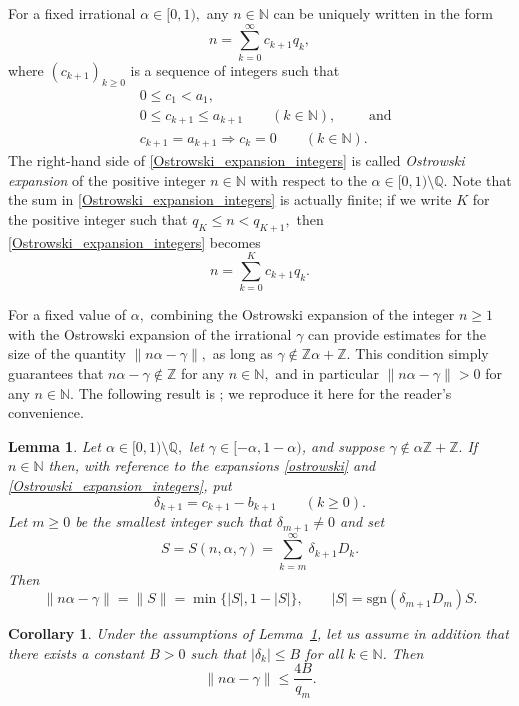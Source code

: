 \documentclass[12pt, reqno]{amsart}
\newtheorem{lemma}[thm]{Lemma}
\newtheorem{cor}[thm]{Corollary}
\theoremstyle{definition}
\theoremstyle{remark}
\numberwithin{equation}{section}
\def\alp{{\alpha}} \def\bfalp{{\boldsymbol \alpha}}
\def\gam{{\gamma}} \def\Gam{{\Gamma}}
\def\del{{\delta}} \def\Del{{\Delta}}
\def\le{\leqslant} \def\ge{\geqslant}
\def\ls{\leqslant} \def\gs{\geqslant}
\def\leq{\leqslant}
\def \bN {\mathbb N}
\def \bQ {\mathbb Q}
\def \bZ {\mathbb Z}
\begin{document}
	For a fixed irrational $\alp\in [0,1),$ any $n\in \bN$ can be uniquely written in the form  
	\begin{equation} \label{Ostrowski_expansion_integers}
		n= \sum_{k=0}^\infty c_{k+1} q_k, 
	\end{equation}
	where $(c_{k+1})_{k\gs 0}$ is a sequence of integers such that 
	\begin{align*}
		& 0 \le c_1 < a_1,  \\
		& 0 \le c_{k+1} \le a_{k+1}
		\qquad (k \in \bN), \qquad \text{ and} \\
		&  c_{k+1} = a_{k+1} \Longrightarrow c_k = 0 \qquad (k \in \bN).
	\end{align*}
	The right-hand side of \eqref{Ostrowski_expansion_integers} is called \emph{Ostrowski expansion} of the positive integer  $n \in \bN$ with respect to the $\alp\in [0,1) \setminus \bQ.$ Note that the sum in \eqref{Ostrowski_expansion_integers} is actually finite; if we write $K$ for the positive integer such that $q_K \ls n < q_{K+1},$ then \eqref{Ostrowski_expansion_integers} becomes
	\[
	n = \sum_{k=0}^K c_{k+1}q_k.
	\]
	
	For a fixed value of $\alp,$ combining the Ostrowski expansion of the integer $n\gs 1$ with the Ostrowski expansion of the irrational $\gamma$ can provide estimates for the size of the quantity $\|n\alpha -\gam\|,$ as long as $\gamma\notin \bZ\alp + \bZ.$ This condition simply guarantees that $n\alpha -\gamma\notin\bZ$ for any $n\in\bN,$ and in particular $\|n\alp-\gam\|>0$ for any $n\in\bN.$ The following result is \cite[Lemma 4.3]{BHV}; we reproduce it here for the reader's convenience. 
	
	\begin{lemma}\label{nag} Let $\alp \in [0,1)\setminus \bQ,$ let $\gam\in[-\alp,1-\alp)$, and suppose $\gam\notin \alp\bZ + \bZ.$ If $n\in\bN$ then, with reference to the expansions \eqref{ostrowski} and \eqref{Ostrowski_expansion_integers}, put
		\begin{equation} \label{delta_k_def}
			\del_{k+1} = c_{k+1} - b_{k+1} \qquad (k \gs 0).
		\end{equation}
		Let $m\gs 0$ be the smallest integer such that $\delta_{m+1}\neq 0$ and set 
		\[ S = S(n,\alp,\gam) = \sum_{k=m}^{\infty}\delta_{k+1}D_k.  \]
		Then 
		\[
		\|n\alp -\gam\| = \|S\| 
		= \min\{|S|, 1-|S|\}, \qquad 
		|S| = \mathrm{sgn}(\delta_{m+1}D_m)S.
		\]
	\end{lemma}
	
	\begin{cor} \label{cor_nag}
		Under the assumptions of Lemma~\ref{nag}, let us assume in addition that there exists a constant $B>0$ such that $|\delta_k|\leq B$ for all $k\in\bN$. Then
		\[
		\|n\alp-\gam\|\leq \frac{4 B}{q_m}.
		\]
	\end{cor}
	
\end{document}
